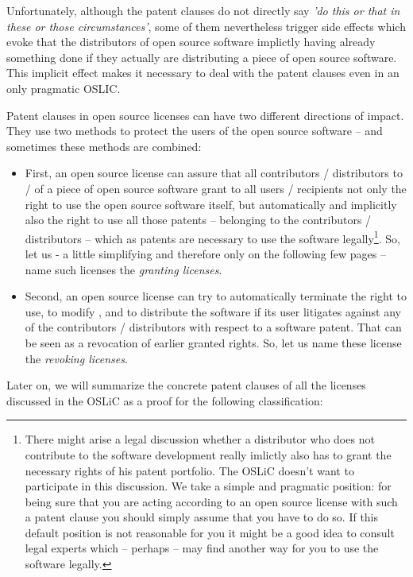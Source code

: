Unfortunately, although the patent clauses do not directly say \emph{'do this or
that in these or those circumstances'}, some of them nevertheless trigger side
effects which evoke that the distributors of open source software implictly
having already something done if they actually are distributing a piece of open
source software. This implicit effect makes it necessary to deal with the patent
clauses even in an only pragmatic OSLIC.

Patent clauses in open source licenses can have two different directions of
impact. They use two methods to protect the users of the open source software --
and sometimes these methods are combined:

\begin{itemize}
  \item First, an open source license can assure that all contributors /
  distributors to / of a piece of open source software grant to all users /
  recipients not only the right to use the open source software itself, but
  automatically and implicitly also the right to use all those patents --
  belonging to the contributors / distributors -- which as patents are necessary
  to use the software legally\footnote{There might arise a legal discussion
  whether a distributor who does not contribute to the software development
  really imlictly also has to grant the necessary rights of his patent
  portfolio. The OSLiC doesn't want to participate in this discussion. We take a
  simple and pragmatic position: for being sure that you are acting according to
  an open source license with such a patent clause you should simply assume that
  you have to do so. If this default position is not reasonable for you it might
  be a good idea to consult legal experts which -- perhaps -- may find another
  way for you to use the software legally.}. So, let us - a little simplifying
  and therefore only on the following few pages -- name such licenses the
  \emph{granting licenses}.
  \item Second, an open source license can try to automatically terminate the
  right to use, to modify , and to distribute the software if its user litigates
  against any of the contributors / distributors with respect to a software
  patent. That can be seen as a revocation of earlier granted rights. So, let us
  name these license the \emph{revoking licenses}.
\end{itemize}

Later on, we will summarize the concrete patent clauses of all the licenses
discussed in the OSLiC as a proof for the following classification:

